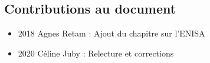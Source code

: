 \subsection{Contributions au document}
\begin{itemize}
\item 2018 Agnes Retam : Ajout du chapitre sur l’ENISA
\item 2020 Céline Juby : Relecture et corrections
\end{itemize}

